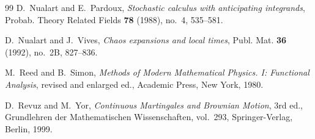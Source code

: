 \documentclass[11pt,reqno]{amsart}
\theoremstyle{plain}
\theoremstyle{definition}
\theoremstyle{remark}
\begin{document}
\begin{thebibliography}{99}
D.~Nualart and E.~Pardoux,
\emph{Stochastic calculus with anticipating integrands},
Probab. Theory Related Fields \textbf{78} (1988), no.~4, 535--581.

D.~Nualart and J.~Vives,
\emph{Chaos expansions and local times},
Publ. Mat. \textbf{36} (1992), no.~2B, 827--836.

M.~Reed and B.~Simon,
\emph{Methods of Modern Mathematical Physics. I: Functional Analysis},
revised and enlarged ed., Academic Press, New York, 1980.

D.~Revuz and M.~Yor,
\emph{Continuous Martingales and Brownian Motion},
3rd ed., Grundlehren der Mathematischen Wissenschaften, vol.~293,
Springer-Verlag, Berlin, 1999.

\end{thebibliography}
\end{document}
